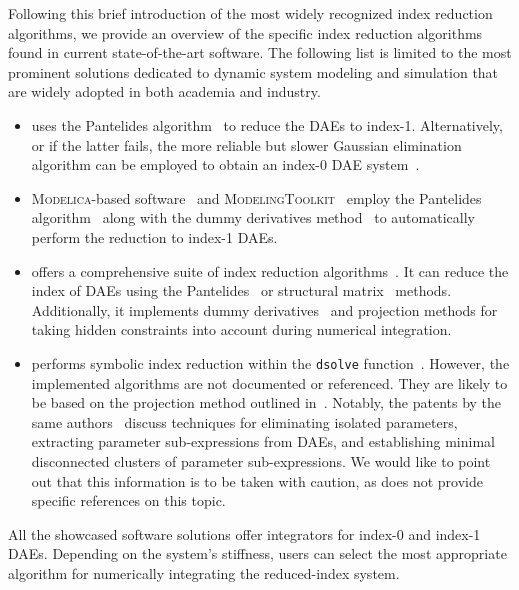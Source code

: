 Following this brief introduction of the most widely recognized index reduction algorithms, we provide an overview of the specific index reduction algorithms found in current state-of-the-art software. The following list is limited to the most prominent solutions dedicated to dynamic system modeling and simulation that are widely adopted in both academia and industry.
%
\begin{itemize}
  \setlength{\itemsep}{-0.2em}
  \item \Matlab{} uses the Pantelides algorithm~\cite{pantelides1988consistent} to reduce the \acp{DAE} to index-1. Alternatively, or if the latter fails, the more reliable but slower Gaussian elimination algorithm can be employed to obtain an index-0 \ac{DAE} system~\cite{matlab}.
  \item \textsc{Modelica}-based software~\cite{mattsson1997modelica, mattsson1998physical} and \textsc{ModelingToolkit}~\cite{modelingtoolkit} employ the Pantelides algorithm~\cite{pantelides1988consistent} along with the dummy derivatives method~\cite{mattsson1993index} to automatically perform the reduction to index-1 \acp{DAE}.
  \item \Mathematica{} offers a comprehensive suite of index reduction algorithms~\cite{mathematica}. It can reduce the index of \acp{DAE} using the Pantelides~\cite{pantelides1988consistent} or structural matrix~ \cite{unger1995structural, chowdhry2004symbolic} methods. Additionally, it implements dummy derivatives~\cite{mattsson1993index} and projection methods for taking hidden constraints into account during numerical integration.
  \item \Maple{} performs symbolic index reduction within the \texttt{dsolve} function~\cite{maple}. However, the implemented algorithms are not documented or referenced. They are likely to be based on the projection method outlined in~\cite{shmoylova2013simplification}. Notably, the patents by the same authors~\cite{postma2012exact, shmoylova2012method, postma2015exact} discuss techniques for eliminating isolated parameters, extracting parameter sub-expressions from \acp{DAE}, and establishing minimal disconnected clusters of parameter sub-expressions. We would like to point out that this information is to be taken with caution, as \Maple{} does not provide specific references on this topic.
\end{itemize}
%
All the showcased software solutions offer integrators for index-0 and index-1 \acp{DAE}. Depending on the system's stiffness, users can select the most appropriate algorithm for numerically integrating the reduced-index system.

